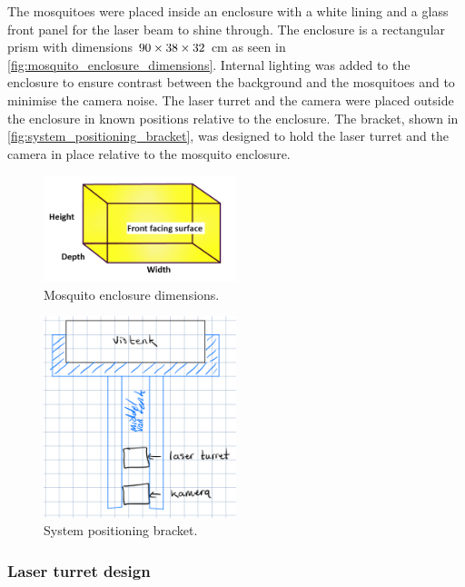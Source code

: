 The mosquitoes were placed inside an enclosure with a white lining and a glass front panel for the laser beam to shine through. The enclosure is a rectangular prism with dimensions $90 \times 38 \times 32$ cm as seen in \autoref{fig:mosquito_enclosure_dimensions}. Internal lighting was added to the enclosure to ensure contrast between the background and the mosquitoes and to minimise the camera noise. The laser turret and the camera were placed outside the enclosure in known positions relative to the enclosure. The bracket, shown in \autoref{fig:system_positioning_bracket}, was designed to hold the laser turret and the camera in place relative to the mosquito enclosure.

\begin{figure}[h]
    \centering
    \includegraphics[width=0.5\textwidth]{figures/hardware_design/rectangular_prism.png}
    \caption{Mosquito enclosure dimensions.}
    \label{fig:mosquito_enclosure_dimensions}
\end{figure}

\begin{figure}[h]
    \centering
    \includegraphics[width=0.5\textwidth]{figures/hardware_design/positioning_bracket.png}
    \caption{System positioning bracket.}
    \label{fig:system_positioning_bracket}
\end{figure}

\subsubsection{Laser turret design}

